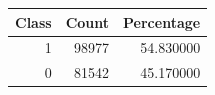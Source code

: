 \begin{tabular}{rrr}
\toprule
Class & Count & Percentage \\
\midrule
1 & 98977 & 54.830000 \\
0 & 81542 & 45.170000 \\
\bottomrule
\end{tabular}
